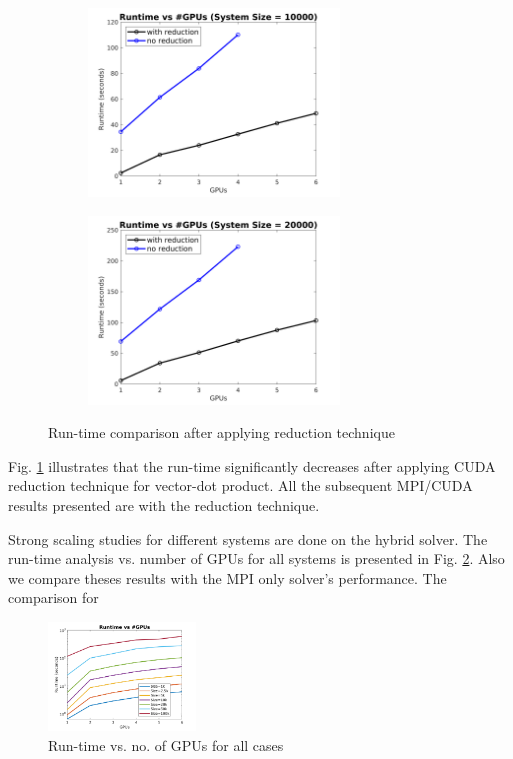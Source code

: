 \documentclass[sigplan,screen]{acmart}
\begin{document}
\begin{figure}
	\begin{subfigure}{0.3\textwidth}
		\includegraphics[trim= 10 5 35 10,clip, width=0.95\linewidth, height=5cm]{plots/CUDA_strong_10k.png} 
		\caption{}
	\end{subfigure}
	\begin{subfigure}{0.3\textwidth}
		\includegraphics[trim= 10 5 35 10,clip, width=0.95\linewidth, height=5cm]{plots/CUDA_strong_20k.png}
		\caption{}
	\end{subfigure}
	\caption{Run-time comparison after applying reduction technique}
	\label{compare}
\end{figure}
Fig. \ref{compare} illustrates that the run-time significantly decreases after applying CUDA reduction technique for vector-dot product. All the subsequent MPI/CUDA results presented are with the reduction technique. 

Strong scaling studies for different systems are done on the hybrid solver. The run-time analysis vs. number of GPUs for all systems is presented in Fig. \ref{cuda-strong}. Also we compare theses results with the MPI only solver's performance. The comparison for   

\begin{figure}[h!]
	\begin{center}
		\includegraphics[width=0.35\textwidth]{plots/CUDA_strong_allranks_log.png}
	\end{center}
	\caption{Run-time vs. no. of GPUs for all cases}
	\label{cuda-strong}      
\end{figure}
\end{document}
